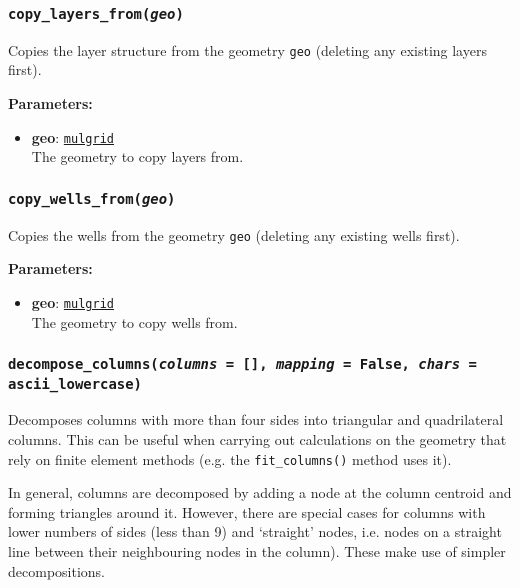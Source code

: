 \begin{snugshade}\subsubsection{\texttt{copy\_layers\_from(\emph{geo})}}\end{snugshade}
\label{sec:mulgrid:copy_layers_from}

Copies the layer structure from the geometry \texttt{geo} (deleting any existing layers first).

\textbf{Parameters:}
\begin{itemize}
\item \textbf{geo}: \hyperref[mulgrids]{\texttt{mulgrid}}\\
  The geometry to copy layers from.
\end{itemize}

\begin{snugshade}\subsubsection{\texttt{copy\_wells\_from(\emph{geo})}}\end{snugshade}
\label{sec:mulgrid:copy_wells_from}

Copies the wells from the geometry \texttt{geo} (deleting any existing wells first).

\textbf{Parameters:}
\begin{itemize}
\item \textbf{geo}: \hyperref[mulgrids]{\texttt{mulgrid}}\\
  The geometry to copy wells from.
\end{itemize}

\begin{snugshade}\subsubsection{\texttt{decompose\_columns(\emph{columns} = [], \emph{mapping} = False, \emph{chars} = ascii\_lowercase)}}\end{snugshade}
\label{sec:mulgrid:decompose_columns}

Decomposes columns with more than four sides into triangular and quadrilateral columns. This can be useful when carrying out calculations on the geometry that rely on finite element methods (e.g. the \texttt{fit\_columns()} method uses it).

In general, columns are decomposed by adding a node at the column centroid and forming triangles around it. However, there are special cases for columns with lower numbers of sides (less than 9) and `straight' nodes, i.e. nodes on a straight line between their neighbouring nodes in the column). These make use of simpler decompositions.

